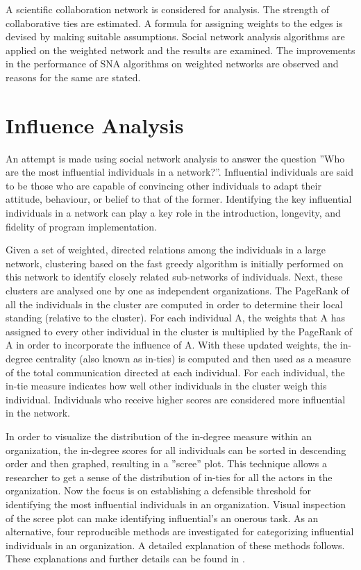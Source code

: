 A scientific collaboration network is considered for analysis. The strength of collaborative ties are estimated. A formula for assigning weights to the edges is devised by making suitable assumptions. Social network analysis algorithms are applied on the weighted network and the results are examined. The improvements in the performance of SNA algorithms on weighted networks are observed and reasons for the same are stated. \cite{clauset2009power}

\section{Influence Analysis}\label{SecIA}

An attempt is made using social network analysis to answer the question ''Who are the most influential individuals in a network?''. Influential individuals are said to be those who are capable of convincing other individuals to adapt their attitude, behaviour, or belief to that of the former. Identifying the key influential individuals in a network can play a key role in the introduction, longevity, and fidelity of program implementation.
 
Given a set of weighted, directed relations among the individuals in a large network, clustering  based on the fast greedy algorithm \cite{clauset2004finding} is initially performed on this network to identify closely related sub-networks of individuals. Next, these clusters are analysed one by one as independent organizations. The PageRank \cite{brin1998anatomy} of all the individuals in the cluster are computed in order to determine their local standing (relative to  the cluster). For each individual A, the weights that A has assigned to every other individual in the cluster is multiplied by the PageRank of A in order to incorporate the influence of A. With these updated weights, the in-degree centrality (also known as in-ties) is computed and then used as a measure of the total communication directed at each individual. For each individual, the in-tie measure indicates how well other individuals in the cluster weigh this individual. Individuals who receive higher scores are considered more influential in the network.

In order to visualize the distribution of the in-degree measure within an organization, the in-degree scores for all individuals can be sorted in descending order and then graphed, resulting in a ''scree'' plot. This technique allows a researcher to get a sense of the distribution of in-ties for all the actors in the organization. Now the focus is on establishing a defensible threshold for identifying the most influential individuals in an organization. Visual inspection of the scree plot can make identifying influential’s an onerous task. As an alternative, four reproducible methods are investigated for categorizing influential individuals in an organization. A detailed explanation of these methods follows. These explanations and further details can be found in \cite{cole2009identifying}.


